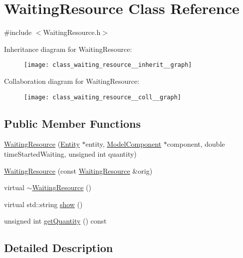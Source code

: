 \hypertarget{class_waiting_resource}{\section{Waiting\-Resource Class Reference}
\label{class_waiting_resource}
}


{\ttfamily \#include $<$Waiting\-Resource.\-h$>$}



Inheritance diagram for Waiting\-Resource\-:\nopagebreak
\begin{figure}[H]
\begin{center}
\leavevmode
\texttt{[image: class\_waiting\_resource\_\_inherit\_\_graph]}
\end{center}
\end{figure}


Collaboration diagram for Waiting\-Resource\-:\nopagebreak
\begin{figure}[H]
\begin{center}
\leavevmode
\texttt{[image: class\_waiting\_resource\_\_coll\_\_graph]}
\end{center}
\end{figure}
\subsection*{Public Member Functions}
\begin{DoxyCompactItemize}
\item 
\hyperlink{class_waiting_resource_a845b5f09fb41f14f9d084f17094560d5}{Waiting\-Resource} (\hyperlink{class_entity}{Entity} $\ast$entity, \hyperlink{class_model_component}{Model\-Component} $\ast$component, double time\-Started\-Waiting, unsigned int quantity)
\item 
\hyperlink{class_waiting_resource_a7780ace7c4d94f544e7f894c5daaa2f8}{Waiting\-Resource} (const \hyperlink{class_waiting_resource}{Waiting\-Resource} \&orig)
\item 
virtual \hyperlink{class_waiting_resource_ac25ae06be17218e803d623fb1398aa8a}{$\sim$\-Waiting\-Resource} ()
\item 
virtual std\-::string \hyperlink{class_waiting_resource_afb0323a90d99b50d66de7f38d069b122}{show} ()
\item 
unsigned int \hyperlink{class_waiting_resource_a3a2be33ed8850145e393e8bf29c6c7ca}{get\-Quantity} () const 
\end{DoxyCompactItemize}


\subsection{Detailed Description}


